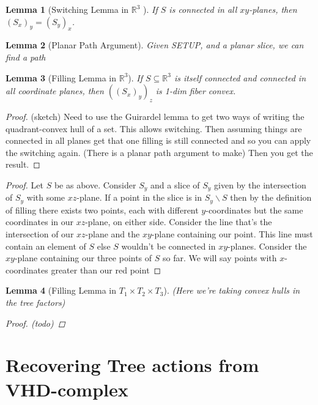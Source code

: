 \documentclass{article}
\newcommand{\sxyz}{((S_x)_y)_z}
\theoremstyle{mystyle}
\newtheorem{lem}{Lemma}[section]
\theoremstyle{remark}
\begin{document}
\begin{lem}
	[Switching Lemma in \(\mathbb{R}^{3}\) ]
	 \label{lem:switch} 
	 If \(S\) is connected in all \(xy\)-planes, then \((S_{x})_{y} = (S_{y})_{x}\).
	
\end{lem}
\begin{lem}
    [Planar Path Argument]
    Given SETUP, and a planar slice, we can find a path
\end{lem}
\begin{lem}
    [Filling Lemma in \(\mathbb{R}^{3}\)]
	\label{lem:fillr3}
	If \(S \subseteq \mathbb{R}^{3}\) is itself connected and connected in all coordinate planes, then \(\sxyz\) is 1-dim fiber convex.
\end{lem}
\begin{proof}
    (sketch) Need to use the Guirardel lemma to get two ways of writing the quadrant-convex hull of a set. This allows switching. Then assuming things are connected in all planes get that one filling is still connected and so you can apply the switching again. (There is a planar path argument to make) Then you get the result.
\end{proof}
\begin{proof}
	Let \(S\) be as above. Consider \(S_{ y}\) and a slice of \(S_{ y}\) given by the intersection of \(S_{ y}\) with some \(xz\)-plane. If a point in the slice is in \(S_{y} \smallsetminus   S\) then by the definition of filling there exists two points, each with different \(y\)-coordinates but the same coordinates in our \(xz\)-plane, on either side. Consider the line that's the intersection of our \(xz\)-plane and the \(xy\)-plane containing our point. This line must contain an element of \(S\) else \(S\) wouldn't be connected in \(xy\)-planes. Consider the \(xy\)-plane containing our three points of \(S\) so far. We will say points with \(x\)-coordinates greater than our red point 
\end{proof}
\begin{lem}
    [Filling Lemma in \(T_{1} \times T_{2} \times T_{3}\)]
	\label{lem:fillt3}
    (Here we're taking convex hulls in the tree factors)
\begin{proof}
    (todo)
\end{proof}
\end{lem}


\section{Recovering Tree actions from VHD-complex}
\end{document}
